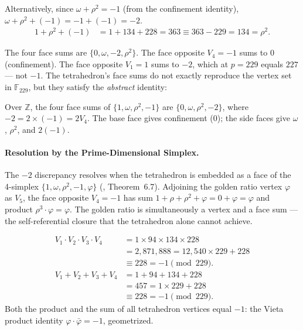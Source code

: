 Alternatively, since $\omega + \rho^2 = -1$ (from the confinement identity),
$\omega + \rho^2 + (-1) = -1 + (-1) = -2$.
\begin{align}
  1 + \rho^2 + (-1) &= 1 + 134 + 228 = 363 \equiv 363 - 229 = 134 = \rho^2.
\end{align}

The four face sums are $\{0, \omega, -2, \rho^2\}$. The face opposite $V_4 = -1$
sums to $0$ (confinement). The face opposite $V_1 = 1$ sums to $-2$, which at
$p = 229$ equals $227$ --- not $-1$. The tetrahedron's face sums do not exactly
reproduce the vertex set in $\mathbb{F}_{229}$, but they satisfy the
\emph{abstract} identity:

\begin{result}
Over $\mathbb{Z}$, the four face sums of $\{1, \omega, \rho^2, -1\}$ are
$\{0, \omega, \rho^2, -2\}$, where $-2 = 2 \times (-1) = 2 V_4$.
The base face gives confinement ($0$); the side faces give
$\omega$, $\rho^2$, and $2(-1)$.
\end{result}

\paragraph{Resolution by the Prime-Dimensional Simplex.}
The $-2$ discrepancy resolves when the tetrahedron is embedded as a
face of the 4-simplex $\{1, \omega, \rho^2, -1, \varphi\}$
(\cite{larue_lc}, Theorem~6.7). Adjoining the golden ratio vertex
$\varphi$ as $V_5$, the face opposite $V_4 = -1$ has sum
$1 + \rho + \rho^2 + \varphi = 0 + \varphi = \varphi$ and product
$\rho^3 \cdot \varphi = \varphi$. The golden ratio is simultaneously
a vertex and a face sum --- the self-referential closure that the
tetrahedron alone cannot achieve.

\begin{result}
\label{res:prodsum}
\begin{align}
  V_1 \cdot V_2 \cdot V_3 \cdot V_4
    &= 1 \times 94 \times 134 \times 228 \\
    &= 2{,}871{,}888 = 12{,}540 \times 229 + 228 \\
    &\equiv 228 = -1 \pmod{229}. \\
  V_1 + V_2 + V_3 + V_4
    &= 1 + 94 + 134 + 228 \\
    &= 457 = 1 \times 229 + 228 \\
    &\equiv 228 = -1 \pmod{229}.
\end{align}
Both the product and the sum of all tetrahedron vertices
equal $-1$: the Vieta product identity $\varphi \cdot \bar\varphi = -1$,
geometrized.
\end{result}

